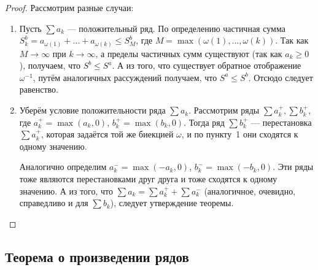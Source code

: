 \begin{proof}
	Рассмотрим разные случаи:
	\begin{enumerate}
		\item Пусть \(\sum a_k\) --- положительный ряд. По определению частичная сумма \(S_k^b = a_{\omega(1)} + \ldots + a_{\omega(k)} \leqslant S_M^b\), где \(M = \max (\omega(1), \ldots, \omega(k))\). Так как \(M \to \infty\) при \(k \to \infty\), а пределы частичных сумм существуют (так как \(a_k \geqslant 0\)), получаем, что \(S^b \leqslant S^a\). А из того, что существует обратное отображение \(\omega^{-1}\), путём аналогичных рассуждений получаем, что \(S^a \leqslant S^b\). Отсюдо следует равенство.
		\item Уберём условие положительности ряда \(\sum a_k\). Рассмотрим ряды \linebreak \(\sum a_k^+, \sum b_k^+\), где \(a_k^+ = \max (a_k, 0)\), \(b_k^+ = \max (b_k, 0)\). Тогда ряд \(\sum b_k^+\) --- перестановка \(\sum a_k^+\), которая задаётся той же биекцией \(\omega\), и по пункту~1 они сходятся к одному значению. 
		
		Аналогично определим \(a_k^- = \max (-a_k, 0)\), \(b_k^- = \max (-b_k, 0)\). Эти ряды тоже являются перестановками друг друга и тоже сходятся к одному значению. А из того, что \(\sum a_k = \sum a_k^+ +\sum a_k^-\) (аналогичное, очевидно, справедливо и для \(\sum b_k\)), следует утверждение теоремы.
	\end{enumerate}
\end{proof}

\subsection{Теорема о произведении рядов}

